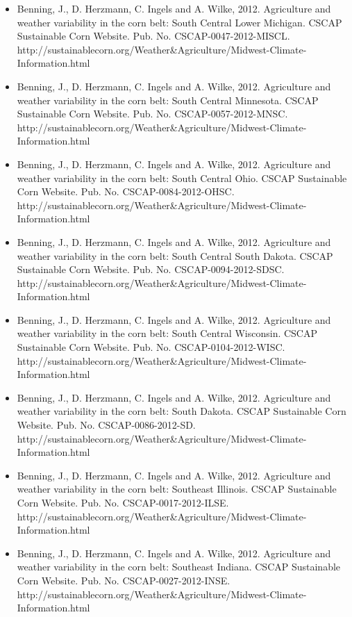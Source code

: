 \begin{itemize}
\item Benning, J., D. Herzmann, C. Ingels and A. Wilke, 2012. Agriculture and weather variability in the corn belt: South Central Lower Michigan. CSCAP Sustainable Corn Website. Pub. No. CSCAP-0047-2012-MISCL. http://sustainablecorn.org/Weather\&Agriculture/Midwest-Climate-Information.html

\item Benning, J., D. Herzmann, C. Ingels and A. Wilke, 2012. Agriculture and weather variability in the corn belt: South Central Minnesota. CSCAP Sustainable Corn Website. Pub. No. CSCAP-0057-2012-MNSC. http://sustainablecorn.org/Weather\&Agriculture/Midwest-Climate-Information.html

\item Benning, J., D. Herzmann, C. Ingels and A. Wilke, 2012. Agriculture and weather variability in the corn belt: South Central Ohio. CSCAP Sustainable Corn Website. Pub. No. CSCAP-0084-2012-OHSC. http://sustainablecorn.org/Weather\&Agriculture/Midwest-Climate-Information.html

\item Benning, J., D. Herzmann, C. Ingels and A. Wilke, 2012. Agriculture and weather variability in the corn belt: South Central South Dakota. CSCAP Sustainable Corn Website. Pub. No. CSCAP-0094-2012-SDSC. http://sustainablecorn.org/Weather\&Agriculture/Midwest-Climate-Information.html

\item Benning, J., D. Herzmann, C. Ingels and A. Wilke, 2012. Agriculture and weather variability in the corn belt: South Central Wisconsin. CSCAP Sustainable Corn Website. Pub. No. CSCAP-0104-2012-WISC. http://sustainablecorn.org/Weather\&Agriculture/Midwest-Climate-Information.html

\item Benning, J., D. Herzmann, C. Ingels and A. Wilke, 2012. Agriculture and weather variability in the corn belt: South Dakota. CSCAP Sustainable Corn Website. Pub. No. CSCAP-0086-2012-SD. http://sustainablecorn.org/Weather\&Agriculture/Midwest-Climate-Information.html

\item Benning, J., D. Herzmann, C. Ingels and A. Wilke, 2012. Agriculture and weather variability in the corn belt: Southeast Illinois. CSCAP Sustainable Corn Website. Pub. No. CSCAP-0017-2012-ILSE. http://sustainablecorn.org/Weather\&Agriculture/Midwest-Climate-Information.html

\item Benning, J., D. Herzmann, C. Ingels and A. Wilke, 2012. Agriculture and weather variability in the corn belt: Southeast Indiana. CSCAP Sustainable Corn Website. Pub. No. CSCAP-0027-2012-INSE. http://sustainablecorn.org/Weather\&Agriculture/Midwest-Climate-Information.html


\end{itemize}

